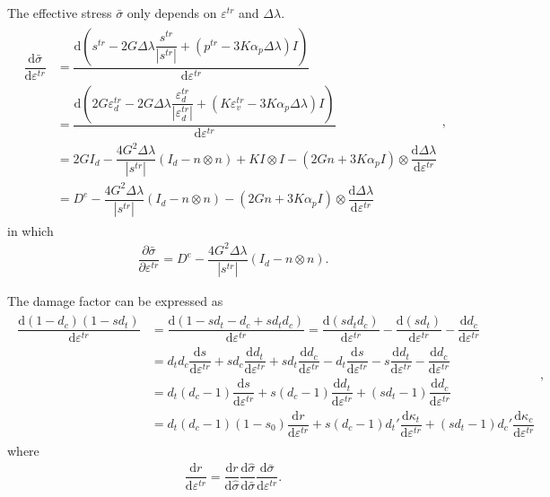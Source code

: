 \documentclass[11pt,fleqn]{article}
\newcommand*{\md}[1]{\mathrm{d}#1}
\newcommand*{\ddfrac}[2]{\dfrac{\md#1}{\md#2}}
\newcommand*{\pfrac}[2]{\dfrac{\partial#1}{\partial#2}}
\begin{document}
The effective stress $\bar{\sigma}$ only depends on $\varepsilon^{tr}$ and $\Delta\lambda$.
\begin{gather}
\begin{split}
\ddfrac{\bar{\sigma}}{\varepsilon^{tr}}&=\ddfrac{\left(s^{tr}-2G\Delta\lambda\dfrac{s^{tr}}{|s^{tr}|}+(p^{tr}-3K\alpha_p\Delta\lambda)I\right)}{\varepsilon^{tr}}\\
&=\ddfrac{\left(2G\varepsilon_d^{tr}-2G\Delta\lambda\dfrac{\varepsilon_d^{tr}}{|\varepsilon_d^{tr}|}+\left(K\varepsilon_v^{tr}-3K\alpha_p\Delta\lambda\right)I\right)}{\varepsilon^{tr}}\\
&=2GI_d-\dfrac{4G^2\Delta\lambda}{|s^{tr}|}\left(I_d-n\otimes{}n\right)+KI\otimes{}I-\left(2Gn+3K\alpha_pI\right)\otimes\ddfrac{\Delta\lambda}{\varepsilon^{tr}}\\
&=D^e-\dfrac{4G^2\Delta\lambda}{|s^{tr}|}\left(I_d-n\otimes{}n\right)-\left(2Gn+3K\alpha_pI\right)\otimes\ddfrac{\Delta\lambda}{\varepsilon^{tr}}
\end{split},
\end{gather}
in which
\begin{gather}
\pfrac{\bar{\sigma}}{\varepsilon^{tr}}=D^e-\dfrac{4G^2\Delta\lambda}{|s^{tr}|}\left(I_d-n\otimes{}n\right).
\end{gather}

The damage factor can be expressed as
\begin{gather}
\begin{split}
\ddfrac{(1-d_c)(1-sd_t)}{\varepsilon^{tr}}&=\ddfrac{\left(1-sd_t-d_c+sd_td_c\right)}{\varepsilon^{tr}}=\ddfrac{\left(sd_td_c\right)}{\varepsilon^{tr}}-\ddfrac{\left(sd_t\right)}{\varepsilon^{tr}}-\ddfrac{d_c}{\varepsilon^{tr}}\\
&=d_td_c\ddfrac{s}{\varepsilon^{tr}}+sd_c\ddfrac{d_t}{\varepsilon^{tr}}+sd_t\ddfrac{d_c}{\varepsilon^{tr}}-d_t\ddfrac{s}{\varepsilon^{tr}}-s\ddfrac{d_t}{\varepsilon^{tr}}-\ddfrac{d_c}{\varepsilon^{tr}}\\
&=d_t(d_c-1)\ddfrac{s}{\varepsilon^{tr}}+s(d_c-1)\ddfrac{d_t}{\varepsilon^{tr}}+(sd_t-1)\ddfrac{d_c}{\varepsilon^{tr}}\\
&=d_t(d_c-1)(1-s_0)\ddfrac{r}{\varepsilon^{tr}}+s(d_c-1)d_t'\ddfrac{\kappa_t}{\varepsilon^{tr}}+(sd_t-1)d_c'\ddfrac{\kappa_c}{\varepsilon^{tr}}
\end{split},
\end{gather}
where
\begin{gather}
\ddfrac{r}{\varepsilon^{tr}}=\ddfrac{r}{\hat\sigma}\ddfrac{\hat\sigma}{\bar\sigma}\ddfrac{\bar\sigma}{\varepsilon^{tr}}.
\end{gather}
\end{document}
